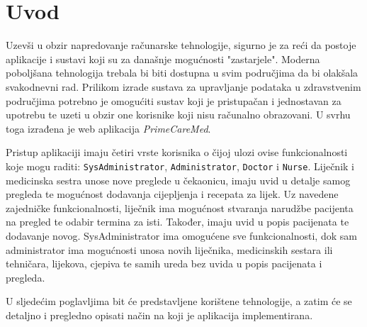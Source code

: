 \section{Uvod}

Uzevši u obzir napredovanje računarske tehnologije, sigurno je za reći da postoje aplikacije i sustavi koji su za današnje mogućnosti "zastarjele". Moderna poboljšana tehnologija trebala bi biti dostupna u svim područjima da bi olakšala svakodnevni rad. Prilikom izrade sustava za upravljanje podataka u zdravstvenim područjima potrebno je omogućiti sustav koji je pristupačan i jednostavan za upotrebu te uzeti u obzir one korisnike koji nisu računalno obrazovani. U svrhu toga izrađena je web aplikacija \textit{PrimeCareMed}. 

Pristup aplikaciji imaju četiri vrste korisnika o čijoj ulozi ovise funkcionalnosti koje mogu raditi: \texttt{SysAdministrator}, \texttt{Administrator}, \texttt{Doctor} i \texttt{Nurse}. Liječnik i medicinska sestra unose nove preglede u čekaonicu, imaju uvid u detalje samog pregleda te mogućnost dodavanja cijepljenja i recepata za lijek. Uz navedene zajedničke funkcionalnosti, liječnik ima mogućnost stvaranja narudžbe pacijenta na pregled te odabir termina za isti. Također, imaju uvid u popis pacijenata te dodavanje novog. SysAdministrator ima omogućene sve funkcionalnosti, dok sam administrator ima mogućnosti unosa novih liječnika, medicinskih sestara ili tehničara, lijekova, cjepiva te samih ureda bez uvida u popis pacijenata i pregleda.

U sljedećim poglavljima bit će predstavljene korištene tehnologije, a zatim će se detaljno i pregledno opisati način na koji je aplikacija implementirana.
